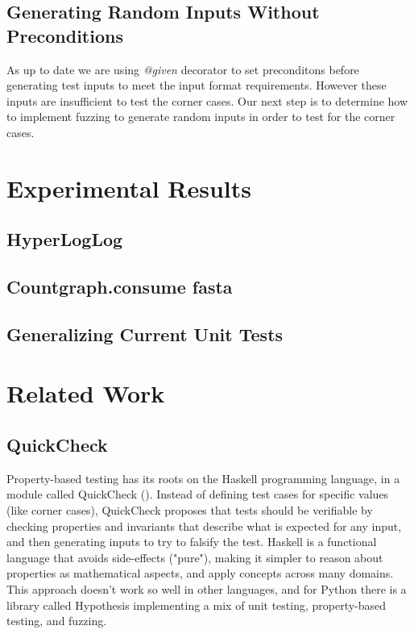 \documentclass[preprint,nocopyrightspace]{sig-alternate}
\begin{document}
\subsection{Generating Random Inputs Without Preconditions}
As up to date we are using \emph{@given} decorator to set preconditons before generating test inputs to meet the input format requirements. 
However these inputs are insufficient to test the corner cases. 
Our next step is to determine how to implement fuzzing to generate random inputs in order to test for the corner cases.

\section{Experimental Results}

\subsection{HyperLogLog}

\subsection{Countgraph.consume fasta}

\subsection{Generalizing Current Unit Tests}

\section{Related Work}

\subsection{QuickCheck}
Property-based testing has its roots on the Haskell programming language,
in a module called QuickCheck (\citet{claessen_quickcheck:_2011}).
Instead of defining test cases for specific values (like corner cases),
QuickCheck proposes that tests should be verifiable by checking properties and invariants that describe what is expected for any input,
and then generating inputs to try to falsify the test.
Haskell is a functional language that avoids side-effects ("pure"),
making it simpler to reason about properties as mathematical aspects,
and apply concepts across many domains.
This approach doesn't work so well in other languages,
and for Python there is a library called Hypothesis implementing a mix of unit testing,
property-based testing,
and fuzzing.
\end{document}
